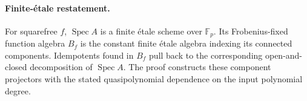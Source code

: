 \paragraph{Finite-\'etale restatement.}
For squarefree \(f\), \(\operatorname{Spec}A\) is a finite
\'etale scheme over \(\mathbb F_p\).
Its Frobenius-fixed function algebra \(B_f\) is the constant
finite \'etale algebra indexing its connected components.
Idempotents found in \(B_f\) pull back to the corresponding
open-and-closed decomposition of \(\operatorname{Spec}A\).
The proof constructs these component projectors with the stated
quasipolynomial dependence on the input polynomial degree.
